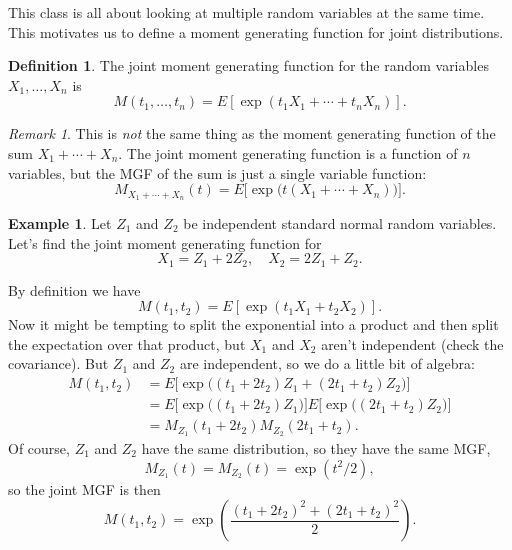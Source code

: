 \documentclass[12pt]{article}
\theoremstyle{plain}
\theoremstyle{definition}
\newtheorem{definition}[theorem]{Definition}
\newtheorem{example}[theorem]{Example}
\theoremstyle{remark}
\newtheorem{remark}[theorem]{Remark}
\begin{document}
This class is all about looking at multiple random variables at the same time.
This motivates us to define a moment generating function for joint distributions.
\begin{definition}
    The joint moment generating function for the random variables $X_1, \ldots, X_n$ is
    \[
        M(t_1, \ldots, t_n) = E[\exp(t_1X_1 + \cdots +t_nX_n)].
    \]
\end{definition}

\begin{remark}
    This is \emph{not} the same thing as the moment generating function of the sum $X_1 + \cdots + X_n$.
    The joint moment generating function is a function of $n$ variables, but the MGF of the sum is just a single variable function:
    \[
        M_{X_1 + \cdots + X_n}(t) = E\big[\exp\big(t(X_1 + \cdots + X_n)\big)\big].
    \]
\end{remark}

\begin{example}\label{two normals}
    Let $Z_1$ and $Z_2$ be independent standard normal random variables.
    Let's find the joint moment generating function for
    \[
        X_1 = Z_1 + 2Z_2,\quad X_2 = 2Z_1 + Z_2.
    \]

    By definition we have
    \[
        M(t_1, t_2) = E[\exp(t_1X_1+t_2X_2)].
    \]
    Now it might be tempting to split the exponential into a product and then split the expectation over that product, but $X_1$ and $X_2$ aren't independent (check the covariance).
    But $Z_1$ and $Z_2$ are independent, so we do a little bit of algebra:
    \begin{align*}
        M(t_1, t_2) &= E\big[\exp\big( (t_1+2t_2)Z_1 + (2t_1+t_2)Z_2\big)\big]\\
        &= E\big[\exp\big((t_1+2t_2)Z_1\big)\big]E\big[\exp\big((2t_1+t_2)Z_2\big)\big]\\
        &= M_{Z_1}(t_1+2t_2)M_{Z_2}(2t_1+t_2).
    \end{align*}
    Of course, $Z_1$ and $Z_2$ have the same distribution, so they have the same MGF,
    \[
        M_{Z_1}(t) = M_{Z_2}(t) = \exp(t^2/2),
    \]
    so the joint MGF is then
    \[
        M(t_1,t_2) = \exp\left(\frac{(t_1+2t_2)^2 + (2t_1+t_2)^2}{2}\right).
    \]
\end{example}
\end{document}
